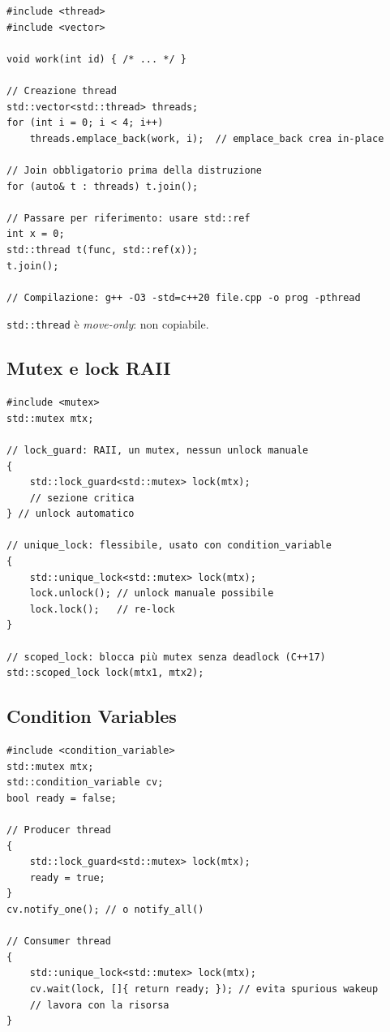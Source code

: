 \documentclass[11pt,a4paper]{article}
\theoremstyle{remark}
\begin{document}
\begin{lstlisting}
#include <thread>
#include <vector>

void work(int id) { /* ... */ }

// Creazione thread
std::vector<std::thread> threads;
for (int i = 0; i < 4; i++)
    threads.emplace_back(work, i);  // emplace_back crea in-place

// Join obbligatorio prima della distruzione
for (auto& t : threads) t.join();

// Passare per riferimento: usare std::ref
int x = 0;
std::thread t(func, std::ref(x));
t.join();

// Compilazione: g++ -O3 -std=c++20 file.cpp -o prog -pthread
\end{lstlisting}

\texttt{std::thread} è \emph{move-only}: non copiabile.

\subsection{Mutex e lock RAII}

\begin{lstlisting}
#include <mutex>
std::mutex mtx;

// lock_guard: RAII, un mutex, nessun unlock manuale
{
    std::lock_guard<std::mutex> lock(mtx);
    // sezione critica
} // unlock automatico

// unique_lock: flessibile, usato con condition_variable
{
    std::unique_lock<std::mutex> lock(mtx);
    lock.unlock(); // unlock manuale possibile
    lock.lock();   // re-lock
}

// scoped_lock: blocca più mutex senza deadlock (C++17)
std::scoped_lock lock(mtx1, mtx2);
\end{lstlisting}

\subsection{Condition Variables}

\begin{lstlisting}
#include <condition_variable>
std::mutex mtx;
std::condition_variable cv;
bool ready = false;

// Producer thread
{
    std::lock_guard<std::mutex> lock(mtx);
    ready = true;
}
cv.notify_one(); // o notify_all()

// Consumer thread
{
    std::unique_lock<std::mutex> lock(mtx);
    cv.wait(lock, []{ return ready; }); // evita spurious wakeup
    // lavora con la risorsa
}
\end{lstlisting}
\end{document}

